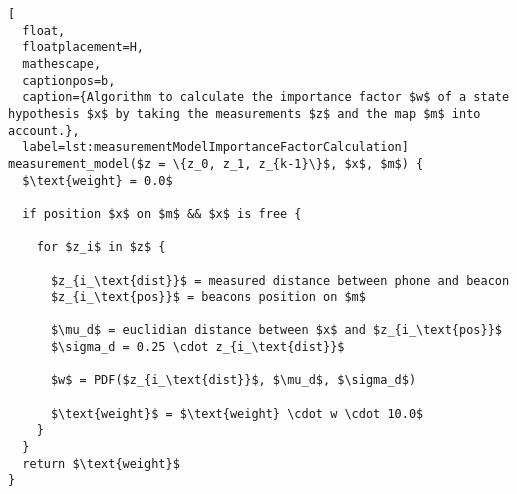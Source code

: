 \begin{lstlisting}[
  float,
  floatplacement=H,
  mathescape,
  captionpos=b,
  caption={Algorithm to calculate the importance factor $w$ of a state hypothesis $x$ by taking the measurements $z$ and the map $m$ into account.},
  label=lst:measurementModelImportanceFactorCalculation]
measurement_model($z = \{z_0, z_1, z_{k-1}\}$, $x$, $m$) {
  $\text{weight} = 0.0$

  if position $x$ on $m$ && $x$ is free {

    for $z_i$ in $z$ {

      $z_{i_\text{dist}}$ = measured distance between phone and beacon
      $z_{i_\text{pos}}$ = beacons position on $m$

      $\mu_d$ = euclidian distance between $x$ and $z_{i_\text{pos}}$
      $\sigma_d = 0.25 \cdot z_{i_\text{dist}}$

      $w$ = PDF($z_{i_\text{dist}}$, $\mu_d$, $\sigma_d$)

      $\text{weight}$ = $\text{weight} \cdot w \cdot 10.0$
    }
  }
  return $\text{weight}$
}
\end{lstlisting}
